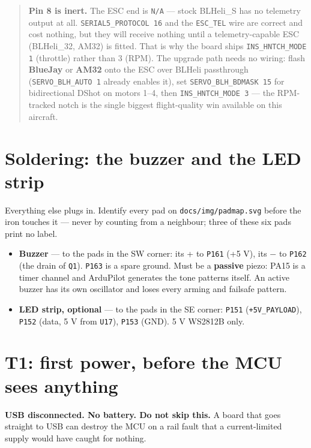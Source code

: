 \documentclass[11pt,a4paper]{article}
\newcommand{\file}[1]{\texttt{\small #1}}
\newcommand{\flag}[1]{\textcolor{warnred}{\textbf{#1}}}
\begin{document}
\begin{quote}
\textbf{Pin 8 is inert.} The ESC end is \file{N/A} --- stock BLHeli\_S has no telemetry
output at all. \file{SERIAL5\_PROTOCOL 16} and the \file{ESC\_TEL} wire are correct and
cost nothing, but they will receive nothing until a telemetry-capable ESC (BLHeli\_32,
AM32) is fitted. That is why the board ships \file{INS\_HNTCH\_MODE 1} (throttle) rather
than 3 (RPM). The upgrade path needs no wiring: flash \textbf{BlueJay} or \textbf{AM32}
onto the ESC over BLHeli passthrough (\file{SERVO\_BLH\_AUTO 1} already enables it), set
\file{SERVO\_BLH\_BDMASK 15} for bidirectional DShot on motors 1--4, then
\file{INS\_HNTCH\_MODE 3} --- the RPM-tracked notch is the single biggest flight-quality win
available on this aircraft.
\end{quote}

\section{Soldering: the buzzer and the LED strip}
\label{sec:solder}

Everything else plugs in. Identify every pad on \file{docs/img/padmap.svg} before the iron
touches it --- never by counting from a neighbour; three of these six pads print no label.

\begin{itemize}
\item \textbf{Buzzer} --- to the pads in the SW corner: its + to \file{P161} (+5 V), its
$-$ to \file{P162} (the drain of \file{Q1}). \file{P163} is a spare ground. Must be a
\textbf{passive} piezo: PA15 is a timer channel and ArduPilot generates the tone patterns
itself. An active buzzer has its own oscillator and loses every arming and failsafe pattern.
\item \textbf{LED strip, optional} --- to the pads in the SE corner: \file{P151}
(\file{+5V\_PAYLOAD}), \file{P152} (data, 5 V from \file{U17}), \file{P153} (GND). 5 V
WS2812B only.
\end{itemize}

\section{T1: first power, before the MCU sees anything}
\label{sec:T1}

\flag{USB disconnected. No battery. Do not skip this.} A board that goes straight to USB
can destroy the MCU on a rail fault that a current-limited supply would have caught for
nothing.
\end{document}
